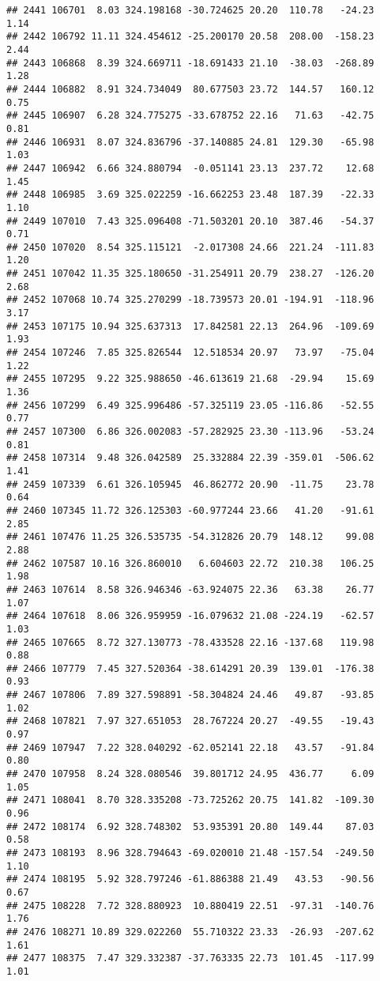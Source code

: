 \documentclass[]{article}
\begin{document}
\begin{verbatim}
## 2441 106701  8.03 324.198168 -30.724625 20.20  110.78   -24.23  1.14
## 2442 106792 11.11 324.454612 -25.200170 20.58  208.00  -158.23  2.44
## 2443 106868  8.39 324.669711 -18.691433 21.10  -38.03  -268.89  1.28
## 2444 106882  8.91 324.734049  80.677503 23.72  144.57   160.12  0.75
## 2445 106907  6.28 324.775275 -33.678752 22.16   71.63   -42.75  0.81
## 2446 106931  8.07 324.836796 -37.140885 24.81  129.30   -65.98  1.03
## 2447 106942  6.66 324.880794  -0.051141 23.13  237.72    12.68  1.45
## 2448 106985  3.69 325.022259 -16.662253 23.48  187.39   -22.33  1.10
## 2449 107010  7.43 325.096408 -71.503201 20.10  387.46   -54.37  0.71
## 2450 107020  8.54 325.115121  -2.017308 24.66  221.24  -111.83  1.20
## 2451 107042 11.35 325.180650 -31.254911 20.79  238.27  -126.20  2.68
## 2452 107068 10.74 325.270299 -18.739573 20.01 -194.91  -118.96  3.17
## 2453 107175 10.94 325.637313  17.842581 22.13  264.96  -109.69  1.93
## 2454 107246  7.85 325.826544  12.518534 20.97   73.97   -75.04  1.22
## 2455 107295  9.22 325.988650 -46.613619 21.68  -29.94    15.69  1.36
## 2456 107299  6.49 325.996486 -57.325119 23.05 -116.86   -52.55  0.77
## 2457 107300  6.86 326.002083 -57.282925 23.30 -113.96   -53.24  0.81
## 2458 107314  9.48 326.042589  25.332884 22.39 -359.01  -506.62  1.41
## 2459 107339  6.61 326.105945  46.862772 20.90  -11.75    23.78  0.64
## 2460 107345 11.72 326.125303 -60.977244 23.66   41.20   -91.61  2.85
## 2461 107476 11.25 326.535735 -54.312826 20.79  148.12    99.08  2.88
## 2462 107587 10.16 326.860010   6.604603 22.72  210.38   106.25  1.98
## 2463 107614  8.58 326.946346 -63.924075 22.36   63.38    26.77  1.07
## 2464 107618  8.06 326.959959 -16.079632 21.08 -224.19   -62.57  1.03
## 2465 107665  8.72 327.130773 -78.433528 22.16 -137.68   119.98  0.88
## 2466 107779  7.45 327.520364 -38.614291 20.39  139.01  -176.38  0.93
## 2467 107806  7.89 327.598891 -58.304824 24.46   49.87   -93.85  1.02
## 2468 107821  7.97 327.651053  28.767224 20.27  -49.55   -19.43  0.97
## 2469 107947  7.22 328.040292 -62.052141 22.18   43.57   -91.84  0.80
## 2470 107958  8.24 328.080546  39.801712 24.95  436.77     6.09  1.05
## 2471 108041  8.70 328.335208 -73.725262 20.75  141.82  -109.30  0.96
## 2472 108174  6.92 328.748302  53.935391 20.80  149.44    87.03  0.58
## 2473 108193  8.96 328.794643 -69.020010 21.48 -157.54  -249.50  1.10
## 2474 108195  5.92 328.797246 -61.886388 21.49   43.53   -90.56  0.67
## 2475 108228  7.72 328.880923  10.880419 22.51  -97.31  -140.76  1.76
## 2476 108271 10.89 329.022260  55.710322 23.33  -26.93  -207.62  1.61
## 2477 108375  7.47 329.332387 -37.763335 22.73  101.45  -117.99  1.01

\end{verbatim}
\end{document}
